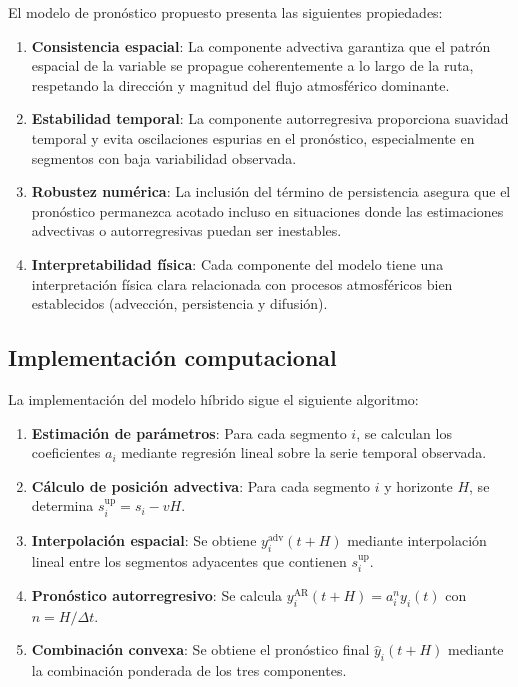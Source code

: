 \documentclass[
  spanish,
  us-letterpaper,
]{scrreprt}
\numberwithin{equation}{section}
\begin{document}
El modelo de pronóstico propuesto presenta las siguientes propiedades:

\begin{enumerate}
\def\labelenumi{\arabic{enumi}.}
\item
  \textbf{Consistencia espacial}: La componente advectiva garantiza que
  el patrón espacial de la variable se propague coherentemente a lo
  largo de la ruta, respetando la dirección y magnitud del flujo
  atmosférico dominante.
\item
  \textbf{Estabilidad temporal}: La componente autorregresiva
  proporciona suavidad temporal y evita oscilaciones espurias en el
  pronóstico, especialmente en segmentos con baja variabilidad
  observada.
\item
  \textbf{Robustez numérica}: La inclusión del término de persistencia
  asegura que el pronóstico permanezca acotado incluso en situaciones
  donde las estimaciones advectivas o autorregresivas puedan ser
  inestables.
\item
  \textbf{Interpretabilidad física}: Cada componente del modelo tiene
  una interpretación física clara relacionada con procesos atmosféricos
  bien establecidos (advección, persistencia y difusión).
\end{enumerate}

\subsection{Implementación
computacional}\label{implementaciuxf3n-computacional-2}

La implementación del modelo híbrido sigue el siguiente algoritmo:

\begin{enumerate}
\def\labelenumi{\arabic{enumi}.}
\item
  \textbf{Estimación de parámetros}: Para cada segmento \(i\), se
  calculan los coeficientes \(a_i\) mediante regresión lineal sobre la
  serie temporal observada.
\item
  \textbf{Cálculo de posición advectiva}: Para cada segmento \(i\) y
  horizonte \(H\), se determina \(s_i^{\text{up}} = s_i - vH\).
\item
  \textbf{Interpolación espacial}: Se obtiene \(y_i^{\text{adv}}(t+H)\)
  mediante interpolación lineal entre los segmentos adyacentes que
  contienen \(s_i^{\text{up}}\).
\item
  \textbf{Pronóstico autorregresivo}: Se calcula
  \(y_i^{\text{AR}}(t+H) = a_i^n y_i(t)\) con \(n = H/\Delta t\).
\item
  \textbf{Combinación convexa}: Se obtiene el pronóstico final
  \(\hat{y}_i(t+H)\) mediante la combinación ponderada de los tres
  componentes.
\end{enumerate}
\end{document}
